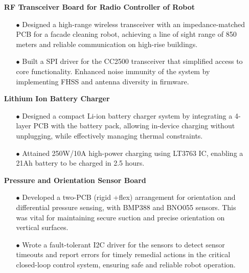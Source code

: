 \documentclass[11pt]{article}
\begin{document}
      \begin{itemize}[leftmargin=0.01in]
        \item[]  \textbf{RF Transceiver Board for Radio Controller of Robot}
            \begin{itemize}\setlength{\itemsep}{0pt}\setlength{\parskip}{0pt}\vspace{-0.3em}
                \item[$\bullet$] Designed a high-range wireless transceiver with an impedance-matched PCB for a facade cleaning robot, achieving a line of sight range of 850 meters and reliable communication on high-rise buildings.
                \item[$\bullet$] Built a SPI driver for the CC2500 transceiver that simplified access to core functionality. Enhanced noise immunity of the system by implementing FHSS and antenna diversity in firmware.
            \end{itemize}
        \item[]  \textbf{Lithium Ion Battery Charger}
            \begin{itemize}\setlength{\itemsep}{0pt}\setlength{\parskip}{0pt}\vspace{-0.3em}
                \item[$\bullet$] Designed a compact Li-ion battery charger system by integrating a 4-layer PCB with the battery pack, allowing in-device charging without unplugging, while effectively managing thermal constraints. 
                \item[$\bullet$] Attained 250W/10A high-power charging using LT3763 IC, enabling a 21Ah battery to be charged in 2.5 hours.
            \end{itemize}
        \item[]  \textbf{Pressure and Orientation Sensor Board}
            \begin{itemize}\setlength{\itemsep}{0pt}\setlength{\parskip}{0pt}\vspace{-0.3em}
                \item[$\bullet$] Developed a two-PCB (rigid +flex) arrangement for orientation and differential pressure sensing, with BMP388 and BNO055 sensors. This was vital for maintaining secure suction and precise orientation on vertical surfaces.
                \item[$\bullet$] Wrote a fault-tolerant I2C driver for the sensors to detect sensor timeouts and report errors for timely remedial actions in the critical closed-loop control system, ensuring safe and reliable robot operation.

\end{itemize}
\end{itemize}
\end{document}
